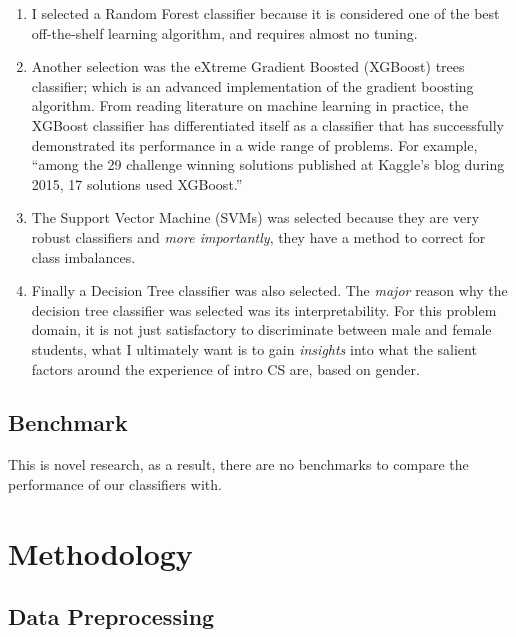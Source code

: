 \begin{enumerate}%
\item I selected a Random Forest classifier because it is considered one of the best off-the-shelf learning algorithm, and requires almost no tuning. 

\item Another selection was the eXtreme Gradient Boosted (XGBoost) trees classifier; which is an advanced implementation of the gradient boosting algorithm. From reading literature on machine learning in practice, the XGBoost classifier has differentiated itself as a classifier that has successfully demonstrated its performance in a wide range of problems. For example, ``among the 29 challenge winning solutions published at Kaggle's blog during 2015, 17 solutions used XGBoost.''

\item The Support Vector Machine (SVMs) was selected because they are very robust classifiers and \textit{more importantly}, they have a method to correct for class imbalances. 
              
\item Finally a Decision Tree classifier was also selected. The \textit{major} reason why the decision tree classifier was selected was its interpretability. For this problem domain, it is not just satisfactory to discriminate between male and female students, what I ultimately want is to gain \textit{insights} into what the salient factors around the experience of intro CS are, based on gender.

\end{enumerate}

\section*{Benchmark}

This is novel research, as a result, there are no benchmarks to compare the performance of our classifiers with.


\chapter*{Methodology}


\section*{Data Preprocessing}

